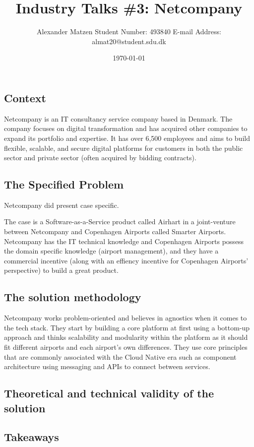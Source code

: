 \documentclass[11pt]{article}
\begin{document}
\setlength\parindent{0pt}
\setlength{\parskip}{.15em}
\pagestyle{empty}

\title{Industry Talks \#3: Netcompany}
\author{Alexander Matzen \addvspace{1em} Student Number: 493840 \newline E-mail Address: almat20@student.sdu.dk}
\date{\today}


\pagecolor{white}



\subsection*{Context}
Netcompany is an IT consultancy service company based in Denmark. The company focuses on digital transformation and has acquired other companies to expand its portfolio and expertise. It has over 6,500 employees and aims to build flexible, scalable, and secure digital platforms for customers in both the public sector and private sector (often acquired by bidding contracts).

\subsection*{The Specified Problem}
Netcompany did present case specific.

The case is a Software-as-a-Service product called Airhart in a joint-venture between Netcompany and Copenhagen Airports called Smarter Airports. Netcompany has the IT technical knowledge and Copenhagen Airports possess the domain specific knowledge (airport management), and they have a commercial incentive (along with an effiency incentive for Copenhagen Airports' perspective) to build a great product.


\subsection*{The solution methodology}
Netcompany works problem-oriented and believes in agnostics when it comes to the tech stack. They start by building a core platform at first using a bottom-up approach and thinks scalability and modularity within the platform as it should fit different airports and each airport's own differences. They use core principles that are commonly associated with the Cloud Native era such as component architecture using messaging and APIs to connect between services.



\subsection*{Theoretical and technical validity of the solution}


\subsection*{Takeaways}
\end{document}
